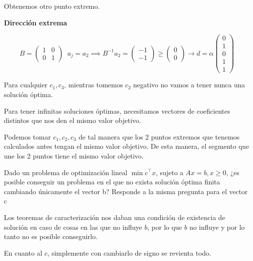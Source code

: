 \begin{problem}[3]
Obtenemos otro punto extremo.

\textbf{Dirección extrema}

\[
B=
	\begin{pmatrix}
	1&0\\
	0&1
	\end{pmatrix}\;\;
a_j = a_2\implies B^{-1}a_2 =
\begin{pmatrix}
-1\\
-1
\end{pmatrix}\geq
\begin{pmatrix}
0\\
0
\end{pmatrix} \to d = α
\begin{pmatrix}
0\\
1\\
0\\
\hline 1\\1
\end{pmatrix}\]

\spart

Para cualquier $c_1,c_3$, mientras tomemos $c_2$ negativo no vamos a tener nunca una solución óptima.

\spart

Para tener infinitas soluciones óptimas, necesitamos vectores de coeficientes distintos que nos den el mismo valor objetivo.

Podemos tomar $c_1,c_2,c_3$ de tal manera que los 2 puntos extremos que tenemos calculados antes tengan el mismo valor objetivo.
%
De esta manera,  el segmento que une los 2 puntos tiene el mismo valor objetivo.
\end{problem}


\begin{problem}[4]

Dado un problema de optimización lineal $\min c^\top x$, sujeto a $Ax = b, x ≥ 0$, ¿es posible conseguir un
problema en el que no exista solución óptima finita cambiando únicamente el vector b? Responde a
la misma pregunta para el vector c

\solution

Los teoremas de caracterización nos daban una condición de existencia de solución en caso de cosas en las que no influye $b$, por lo que $b$ no influye y por lo tanto no es posible conseguirlo.

En cuanto al $c$, simplemente con cambiarlo de signo se revienta todo.

\end{problem}

